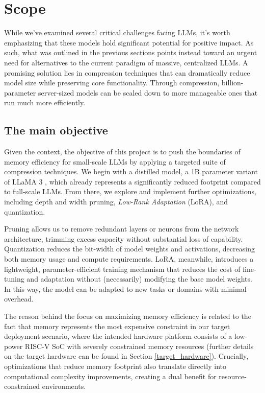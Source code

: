 \section{Scope}
While we've examined several critical challenges facing LLMs, it's worth emphasizing that these models hold significant potential for positive impact. As such, what was outlined in the previous sections points instead toward an urgent need for alternatives to the current paradigm of massive, centralized LLMs. A promising solution lies in compression techniques that can dramatically reduce model size while preserving core functionality. Through compression, billion-parameter server-sized models can be scaled down to more manageable ones that run much more efficiently.

\subsection{The main objective}
Given the context, the objective of this project is to push the boundaries of memory efficiency for small-scale LLMs by applying a targeted suite of compression techniques. We begin with a distilled model, a 1B parameter variant of LLaMA 3 \cite{llama3_1b}, which already represents a significantly reduced footprint compared to full-scale LLMs. From there, we explore and implement further optimizations, including depth and width pruning, \textit{Low-Rank Adaptation} (LoRA), and quantization.

Pruning allows us to remove redundant layers or neurons from the network architecture, trimming excess capacity without substantial loss of capability. Quantization reduces the bit-width of model weights and activations, decreasing both memory usage and compute requirements. LoRA, meanwhile, introduces a lightweight, parameter-efficient training mechanism that reduces the cost of fine-tuning and adaptation without (necessarily) modifying the base model weights. In this way, the model can be adapted to new tasks or domains with minimal overhead.

The reason behind the focus on maximizing memory efficiency is related to the fact that memory represents the most expensive constraint in our target deployment scenario, where the intended hardware platform consists of a low-power RISC-V SoC with severely constrained memory resources (further details on the target hardware can be found in Section \ref{target_hardware}). Crucially, optimizations that reduce memory footprint also translate directly into computational complexity improvements, creating a dual benefit for resource-constrained environments.

